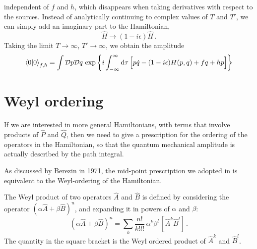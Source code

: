 \documentclass[notes]{subfiles}
\begin{document}
independent of $f$ and $h$, which disappears when taking derivatives
with respect to the sources. Instead of analytically continuing to
complex values of $T$ and $T'$, we can simply add an imaginary part to
the Hamiltonian,
\begin{equation}
  \label{eq:ComplexTermHam}
  \hat{H} \to (1-i\epsilon) \hat{H}\, .
\end{equation}
Taking the limit $T\to\infty$, $T'\to\infty$, we obtain the amplitude
\begin{equation}
  \label{eq:VacToVac}
  \braket{0}{0}_{f,h} = \int \mathcal{D}p \mathcal{D}q \, \exp
  \left\{
    i \int_{-\infty}^\infty \dd{\tau} \Big[
      p \dot{q} - (1-i\epsilon) H(p,q) + f q + h p 
      \Big]
  \right\}
\end{equation}


\section{Weyl ordering}
\label{sec:weyl-ordering}

If we are interested in more general Hamiltonians, with terms that
involve products of $\hat{P}$ and $\hat{Q}$, then we need to give a
prescription for the ordering of the operators in the Hamiltonian, so
that the quantum mechanical amplitude is actually described by the
path integral. 

As discussed by Berezin in 1971, the mid-point prescription we adopted
in  is equivalent to the Weyl-ordering of the
Hamiltonian. 

The Weyl product of two operators $\hat{A}$ and $\hat{B}$ is defined
by considering the operator $\left(\alpha \hat{A} + \beta
  \hat{B}\right)^n$, and expanding it in powers of $\alpha$ and $\beta$: 
\begin{equation}
  \label{eq:WeylOrder}
  \left(\alpha \hat{A} + \beta
    \hat{B}\right)^n = \sum_k \frac{n!}{k! l!}\, 
  \alpha^k \beta^l\, \left[\hat{A}^k
    \hat{B}^l\right]\, .
\end{equation}
The quantity in the square bracket is the Weyl ordered product of
$\hat{A}^k$ and $\hat{B}^l$. 
\end{document}
